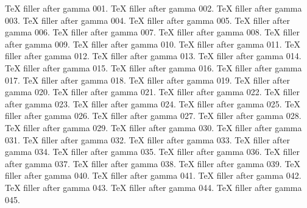 TeX filler after gamma 001.
TeX filler after gamma 002.
TeX filler after gamma 003.
TeX filler after gamma 004.
TeX filler after gamma 005.
TeX filler after gamma 006.
TeX filler after gamma 007.
TeX filler after gamma 008.
TeX filler after gamma 009.
TeX filler after gamma 010.
TeX filler after gamma 011.
TeX filler after gamma 012.
TeX filler after gamma 013.
TeX filler after gamma 014.
TeX filler after gamma 015.
TeX filler after gamma 016.
TeX filler after gamma 017.
TeX filler after gamma 018.
TeX filler after gamma 019.
TeX filler after gamma 020.
TeX filler after gamma 021.
TeX filler after gamma 022.
TeX filler after gamma 023.
TeX filler after gamma 024.
TeX filler after gamma 025.
TeX filler after gamma 026.
TeX filler after gamma 027.
TeX filler after gamma 028.
TeX filler after gamma 029.
TeX filler after gamma 030.
TeX filler after gamma 031.
TeX filler after gamma 032.
TeX filler after gamma 033.
TeX filler after gamma 034.
TeX filler after gamma 035.
TeX filler after gamma 036.
TeX filler after gamma 037.
TeX filler after gamma 038.
TeX filler after gamma 039.
TeX filler after gamma 040.
TeX filler after gamma 041.
TeX filler after gamma 042.
TeX filler after gamma 043.
TeX filler after gamma 044.
TeX filler after gamma 045.
